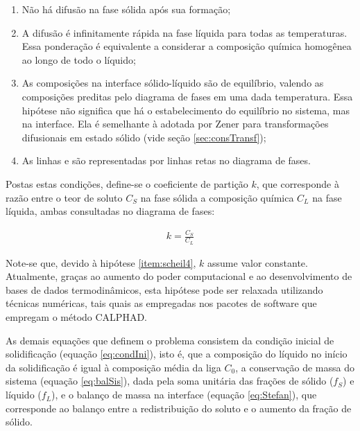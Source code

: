\begin{enumerate}
	\item Não há difusão na fase sólida após sua formação;
	\item A difusão é infinitamente rápida na fase líquida para todas as temperaturas. Essa ponderação é equivalente a considerar a composição química homogênea ao longo de todo o líquido;
	\item As composições na interface sólido-líquido são de equilíbrio, valendo as composições preditas pelo diagrama de fases em uma dada temperatura. Essa hipótese não significa que há o estabelecimento do equilíbrio no sistema, mas  na interface. Ela é semelhante à adotada por Zener para transformações difusionais em estado sólido (vide seção \ref{sec:consTransf});
	\item As linhas  e  são representadas por linhas retas no diagrama de fases. \label{item:scheil4}
\end{enumerate}

Postas estas condições, define-se o coeficiente de partição $k$, que corresponde à razão entre o teor de soluto $C_S$ na fase sólida a composição química $C_L$ na fase líquida, ambas consultadas no diagrama de fases:

\begin{subequations}
	\begin{align}
		\label{eq:coefPart}k = \frac{C_S}{C_L}
	\end{align}
\end{subequations}

Note-se que, devido à hipótese \ref{item:scheil4}, $k$ assume valor constante. Atualmente, graças ao aumento do poder computacional e ao desenvolvimento de bases de dados termodinâmicos, esta hipótese pode ser relaxada utilizando técnicas numéricas, tais quais as empregadas nos pacotes de software que empregam o método CALPHAD. %


As demais equações que definem o problema consistem da condição inicial de solidificação (equação \ref{eq:condIni}), isto é, que a composição do líquido no início da solidificação é igual à composição média da liga $C_0$, a conservação de massa do sistema (equação \ref{eq:balSis}), dada pela soma unitária das frações de sólido ($f_S$) e líquido ($f_L$), e o balanço de massa na interface (equação \ref{eq:Stefan}), que corresponde ao balanço entre a redistribuição do soluto e o aumento da fração de sólido.

